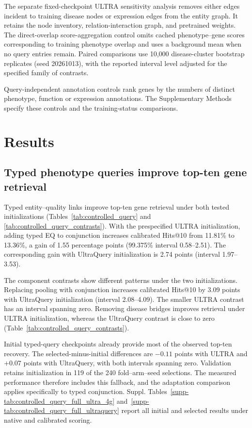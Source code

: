 \documentclass[webpdf,contemporary,large]{oup-authoring-template}%
\theoremstyle{thmstyleone}%
\theoremstyle{thmstyletwo}%
\theoremstyle{thmstylethree}%
\begin{document}
The separate fixed-checkpoint ULTRA sensitivity analysis removes either edges
incident to training disease nodes or expression edges from the entity graph.
It retains the node inventory, relation-interaction graph, and pretrained
weights. The direct-overlap score-aggregation control omits cached
phenotype--gene scores corresponding to training phenotype overlap and uses a
background mean when no query entries remain. Paired comparisons use 10{,}000
disease-cluster bootstrap replicates (seed 20261013), with the reported interval
level adjusted for the specified family of contrasts.

Query-independent annotation controls rank genes by the numbers of distinct
phenotype, function or expression annotations. The Supplementary Methods
specify these controls and the training-status comparisons.


\section{Results}

\subsection{Typed phenotype queries improve top-ten gene retrieval}
\label{sec:ultraquery_results}

Typed entity--quality links improve top-ten gene retrieval under both tested
initializations (Tables~\ref{tab:controlled_query} and
\ref{tab:controlled_query_contrasts}). With the prespecified ULTRA initialization,
adding typed EQ to conjunction increases calibrated Hits@10 from 11.81\% to
13.36\%, a gain of 1.55 percentage points (99.375\% interval 0.58--2.51).
The corresponding gain with UltraQuery initialization is 2.74 points
(interval 1.97--3.53).



The component contrasts show different patterns under the two initializations.
Replacing pooling with conjunction increases calibrated Hits@10 by 3.09 points
with UltraQuery initialization (interval 2.08--4.09). The smaller ULTRA contrast
has an interval spanning zero. Removing disease bridges improves retrieval
under ULTRA initialization, whereas the UltraQuery contrast is close to zero
(Table~\ref{tab:controlled_query_contrasts}).

Initial typed-query checkpoints already provide most of the observed top-ten
recovery. The selected-minus-initial differences are $-0.11$ points with ULTRA
and $+0.07$ points with UltraQuery, with both intervals spanning zero.
Validation retains initialization in 119 of the 240 fold--arm--seed selections.
The measured performance therefore includes this fallback, and the adaptation
comparison applies specifically to typed conjunction. Suppl.
Tables~\ref{supp-tab:controlled_query_full_ultra_4g}
and~\ref{supp-tab:controlled_query_full_ultraquery} report all initial and
selected results under native and calibrated scoring.
\end{document}
